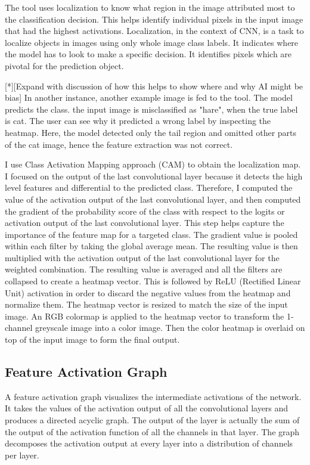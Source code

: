 The tool uses localization to know what region in the image attributed most to the classification decision. This helps identify individual pixels in the input image that had the highest activations. Localization, in the context of CNN, is a task to localize objects in images using only whole image class labels. It indicates where the model has to look to make a specific decision. It identifies pixels which are pivotal for the prediction object.

[*][Expand with discussion of how this helps to show where and why AI might be bias] 
In another instance, another example image is fed to the tool. The model predicts the class. the input image is misclassified as "hare", when the true label is cat. The user can see why it predicted a wrong label by inspecting the heatmap. Here, the model detected only the tail region and omitted other parts of the cat image, hence the feature extraction was not correct.

I use Class Activation Mapping approach (CAM) to obtain the localization map. I focused on the output of the last convolutional layer because it detects the high level features and differential to the predicted class. Therefore, I computed the value of the activation output of the last convolutional layer, and then computed the gradient of the probability score of the class with respect to the logits or activation output of the last convolutional layer. This step helps capture the importance of the feature map for a targeted class. The gradient value is pooled within each filter by taking the global average mean. The resulting value is then multiplied with the activation output of the last convolutional layer for the weighted combination. The resulting value is averaged and all the filters are collapsed to create a heatmap vector. This is followed by ReLU (Rectified Linear Unit) activation in order to discard the negative values from the heatmap and normalize them. The heatmap vector is resized to match the size of the input image. An RGB colormap is applied to the heatmap vector to transform the 1-channel greyscale image into a color image. Then the color heatmap is overlaid on top of the input image to form the final output.

\subsection{Feature Activation Graph}

A feature activation graph visualizes the intermediate activations of the network. It takes the values of the activation output of all the convolutional layers and produces a directed acyclic graph. The output of the layer is actually the sum of the output of the activation function of all the channels in that layer. The graph decomposes the activation output at every layer into a distribution of channels per layer.

